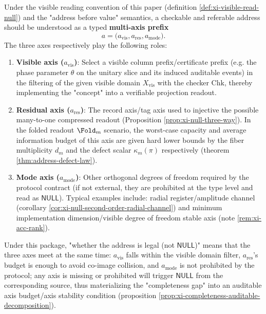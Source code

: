\begin{definition}\label{def:multi_axis_address}
Under the visible reading convention of this paper (definition \ref{def:xi-visible-read-null}) and the "address before value" semantics, a checkable and referable address should be understood as a typed \textbf{multi-axis prefix}
\[
a=\bigl(a_{\mathrm{vis}},a_{\mathrm{res}},a_{\mathrm{mode}}\bigr).
\]
The three axes respectively play the following roles:
\begin{enumerate}
  \item \textbf{Visible axis (\(a_{\mathrm{vis}}\))}: Select a visible column prefix/certificate prefix (e.g. the phase parameter \(\theta\) on the unitary slice and its induced auditable events) in the filtering of the given visible domain \(X_{\mathrm{vis}}\) with the checker \(\mathrm{Chk}\), thereby implementing the "concept" into a verifiable projection readout.
  \item \textbf{Residual axis (\(a_{\mathrm{res}}\))}: The record axis/tag axis used to injective the possible many-to-one compressed readout (Proposition \ref{prop:xi-null-three-way}). In the folded readout \(\Fold_m\) scenario, the worst-case capacity and average information budget of this axis are given hard lower bounds by the fiber multiplicity \(d_m\) and the defect scalar \(\kappa_m(\pi)\) respectively (theorem \ref{thm:address-defect-law}).
  \item \textbf{Mode axis (\(a_{\mathrm{mode}}\))}: Other orthogonal degrees of freedom required by the protocol contract (if not external, they are prohibited at the type level and read as \(\mathsf{NULL}\)). Typical examples include: radial register/amplitude channel (corollary \ref{cor:xi-null-second-order-radial-channel}) and minimum implementation dimension/visible degree of freedom stable axis (note \ref{rem:xi-acc-rank}).
\end{enumerate}
\par
Under this package, "whether the address is legal (not \(\mathsf{NULL}\))" means that the three axes meet at the same time: \(a_{\mathrm{vis}}\) falls within the visible domain filter, \(a_{\mathrm{res}}\)'s budget is enough to avoid co-image collision, and \(a_{\mathrm{mode}}\) is not prohibited by the protocol; any axis is missing or prohibited will trigger \(\mathsf{NULL}\) from the corresponding source, thus materializing the "completeness gap" into an auditable axis budget/axis stability condition (proposition \ref{prop:xi-completeness-auditable-decomposition}).
\end{definition}

